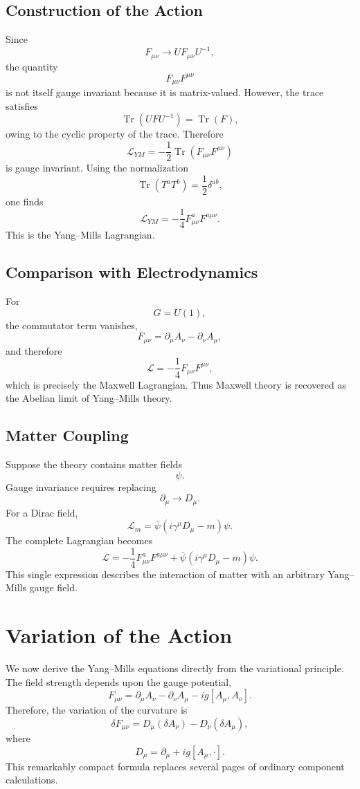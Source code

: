 \subsection{Construction of the Action}
Since
\[F_{\mu\nu}\rightarrow UF_{\mu\nu}U^{-1},\]
the quantity
\[F_{\mu\nu}F^{\mu\nu}\]
is not itself gauge invariant because it is matrix-valued.
However,
the trace satisfies
\[\operatorname{Tr}(UFU^{-1})=\operatorname{Tr}(F),\]
owing to the cyclic property of the trace.
Therefore
\[\boxed{\mathcal L_{YM}=-\frac12\operatorname{Tr}(F_{\mu\nu}F^{\mu\nu})}\]
is gauge invariant.
Using the normalization
\[\operatorname{Tr}(T^aT^b)=\frac12\delta^{ab},\]
one finds
\[\boxed{\mathcal L_{YM}=-\frac14F_{\mu\nu}^aF^{a\mu\nu}.}\]
This is the Yang--Mills Lagrangian.
\subsection{Comparison with Electrodynamics}
For
\[G=U(1),\]
the commutator term vanishes,
\[F_{\mu\nu}=\partial_\mu A_\nu-\partial_\nu A_\mu,\]
and therefore
\[\boxed{\mathcal L=-\frac14F_{\mu\nu}F^{\mu\nu},}\]
which is precisely the Maxwell Lagrangian.
Thus Maxwell theory is recovered as the Abelian limit of Yang--Mills
theory.
\subsection{Matter Coupling}
Suppose the theory contains matter fields
\[\psi.\]
Gauge invariance requires replacing
\[\partial_\mu\rightarrow D_\mu.\]
For a Dirac field,
\[\boxed{\mathcal L_m=\bar\psi(i\gamma^\mu D_\mu-m)\psi.}\]
The complete Lagrangian becomes
\[\boxed{\mathcal L=-\frac14 F_{\mu\nu}^aF^{a\mu\nu}
+\bar\psi(i\gamma^\mu D_\mu-m)\psi.}\]
This single expression describes the interaction of matter with an
arbitrary Yang--Mills gauge field.
\section{Variation of the Action}
We now derive the Yang--Mills equations directly from the variational
principle.
The field strength depends upon the gauge potential,
\[F_{\mu\nu}=\partial_\mu A_\nu-\partial_\nu A_\mu-ig[A_\mu,A_\nu].\]
Therefore,
the variation of the curvature is
\[\delta F_{\mu\nu}=D_\mu(\delta A_\nu)-D_\nu(\delta A_\mu),\]
where
\[D_\mu=\partial_\mu+ig[A_\mu,\cdot].\]
This remarkably compact formula replaces several pages of ordinary
component calculations.
